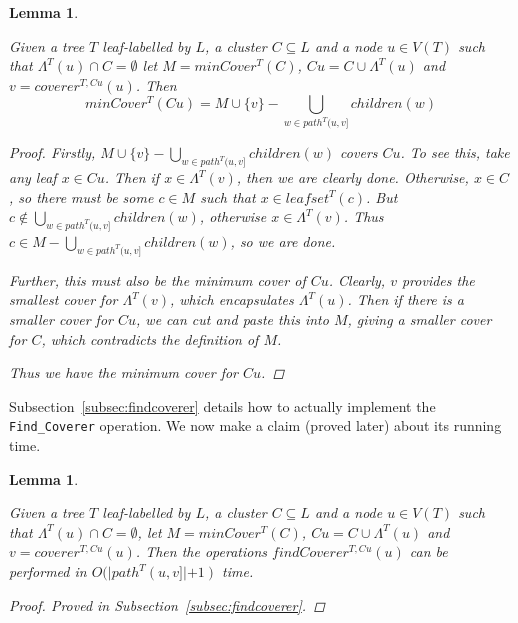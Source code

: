 \documentclass{article}
\newcommand{\leafset}{\Lambda}
\newtheorem{mincoverrecursive}[incompatibility]{Lemma}
\newtheorem{findcovererruntime}[incompatibility]{Lemma}
\begin{document}
    \begin{mincoverrecursive}
        \label{lem:mincoverrecursive}

        Given a tree $T$ leaf-labelled by $L$, a cluster $C \subseteq L$ and a node $u \in V(T)$ such that $\leafset^{T}(u) \cap C = \emptyset$ let $M = minCover^{T}(C)$, $Cu = C \cup \leafset^{T}(u)$ and $v = coverer^{T, Cu}(u)$. Then
         \[minCover^{T}(Cu) = M \cup \{v\} - \bigcup_{w \in path^{T}(u, v]} children(w)\]

        \begin{proof}
            Firstly, $M \cup \{v\} - \bigcup_{w \in path^{T}(u, v]} children(w)$ covers $Cu$. To see this, take any leaf $x \in Cu$. Then if $x \in \leafset^{T}(v)$, then we are clearly done. Otherwise, $x \in C$, so there must be some $c \in M$ such that $x \in leafset^{T}(c)$. But $c \not\in \bigcup_{w \in path^{T}(u, v]} children(w)$, otherwise $x \in \leafset^{T}(v)$. Thus $c \in M - \bigcup_{w \in path^{T}(u, v]} children(w)$, so we are done.

            Further, this must also be the minimum cover of $Cu$. Clearly, $v$ provides the smallest cover for $\leafset^{T}(v)$, which encapsulates $\leafset^{T}(u)$. Then if there is a smaller cover for $Cu$, we can cut and paste this into $M$, giving a smaller cover for $C$, which contradicts the definition of $M$.

            Thus we have the minimum cover for $Cu$.
        \end{proof}
    \end{mincoverrecursive}

    Subsection~\ref{subsec:findcoverer} details how to actually implement the \texttt{Find\_Coverer} operation. We now make a claim (proved later) about its running time.
    \newline

    \begin{findcovererruntime}
        \label{lem:findcovererruntime}

        Given a tree $T$ leaf-labelled by $L$, a cluster $C \subseteq L$ and a node $u \in V(T)$ such that $\leafset^{T}(u) \cap C = \emptyset$, let $M = minCover^{T}(C)$, $Cu = C \cup \leafset^{T}(u)$ and $v = coverer^{T, Cu}(u)$. Then the operations $findCoverer^{T, Cu}(u)$ can be performed in $O(|path^{T}(u, v]| + 1)$ time.

        \begin{proof}
            Proved in Subsection~\ref{subsec:findcoverer}.
        \end{proof}
    \end{findcovererruntime}
\end{document}

